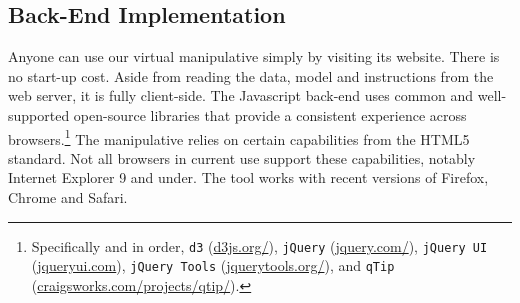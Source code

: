 \documentclass[11pt,letterpaper]{article}
\newcommand{\Note}[1]{}
\newcommand{\NoteSigned}[3]{{\sethlcolor{#2}\Note{#1: #3}}}
\newcommand{\NoteFF}[1]{\NoteSigned{FF}{LightBlue}{#1}}
\newcommand{\NoteJE}[1]{\NoteSigned{JE}{LightGreen}{#1}}
\begin{document}
\subsection{Back-End Implementation}\label{sec:backend}
Anyone can use our virtual manipulative simply by visiting its website.
There is no start-up cost.
Aside from reading the data, model and instructions from the web server, it is fully 
client-side. The Javascript back-end uses common and well-supported open-source 
libraries 
that provide a consistent experience across browsers.\footnote{Specifically and in order, 
\texttt{d3} (\url{d3js.org/}),
\texttt{jQuery} (\url{jquery.com/}), 
\texttt{jQuery UI} (\url{jqueryui.com}),
\texttt{jQuery Tools} (\url{jquerytools.org/}), and
\texttt{qTip} (\url{craigsworks.com/projects/qtip/}).}
The manipulative relies on certain capabilities from the HTML5
standard.  Not all browsers in current use support these
capabilities, notably Internet Explorer 9 and under.
The tool works with recent versions of Firefox, Chrome and Safari.
%


%
%
%
\end{document}
